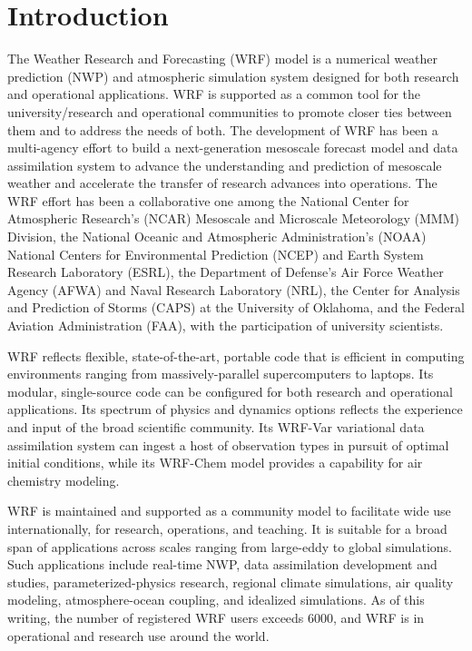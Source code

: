 \chapter{Introduction}
\label{introduction_chap}
The Weather Research and Forecasting (WRF) model is
a numerical weather prediction (NWP) and atmospheric simulation 
system designed for both 
research and operational applications.  WRF is supported 
as a common tool for the university/research and operational 
communities to promote closer ties between them and to 
address the needs of both.  The development of WRF has been a 
multi-agency effort to build a next-generation mesoscale forecast model 
and data assimilation system to advance the understanding and prediction 
of mesoscale weather and accelerate the transfer of research 
advances into operations.  The WRF effort has been a collaborative one 
among the National Center for Atmospheric Research's (NCAR) 
Mesoscale and Microscale Meteorology (MMM) Division, the 
National Oceanic and Atmospheric Administration's 
(NOAA) National Centers for Environmental Prediction (NCEP) and 
Earth System Research Laboratory (ESRL), the Department of Defense's 
Air Force Weather Agency (AFWA) and Naval Research Laboratory (NRL), 
the Center for Analysis and Prediction of Storms (CAPS) at the University 
of Oklahoma, and the Federal Aviation Administration (FAA), 
with the participation of university scientists. 

WRF reflects flexible, state-of-the-art, portable code that is 
efficient in computing environments ranging from massively-parallel
supercomputers to laptops. 
Its modular, single-source code can be configured for both 
research and operational applications.  Its spectrum of physics
and dynamics options reflects the experience and input of the 
broad scientific community.  Its WRF-Var variational data assimilation 
system can ingest a host of observation types in pursuit of 
optimal initial conditions, while its WRF-Chem  
model provides a capability for air chemistry modeling.

WRF is maintained and 
supported as a community model to facilitate wide use internationally, 
for research, operations, and teaching.
It is suitable for a broad span of applications across 
scales ranging from large-eddy to global simulations.  Such applications 
include real-time NWP, data assimilation 
development and studies, parameterized-physics research, regional 
climate simulations, air quality modeling, atmosphere-ocean coupling, and 
idealized simulations.  As of this writing, 
the number of registered WRF users exceeds 6000, and WRF is in 
operational and research use around the world.

